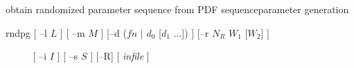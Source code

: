 % 
% 
% 
% 
%                                                                        
%
%
{obtain randomized parameter sequence from PDF sequence}{parameter generation}

\def\bmath#1{\mbox{\boldmath{$#1$}}}
\def\bc{\bmath{c}}
\def\bo{\bmath{o}}
\def\bC{\bmath{C}}
\def\bO{\bmath{O}}
\def\bU{\bmath{U}}
\def\bmu{\bmath{\mu}}

\begin{synopsis}
	\item [rndpg] [ --l $L$ ] [ --m $M$ ] 
		[--d ($fn$ $|$ $d_0$ [$d_1$ $\ldots$]) ]
		[--r $N_R$ $W_1$ [$W_2$] ]
	\item [\ ~~~~] [ --i $I$ ] [ --s $S$ ] [--R] [ {\em infile} ] 
\end{synopsis}

